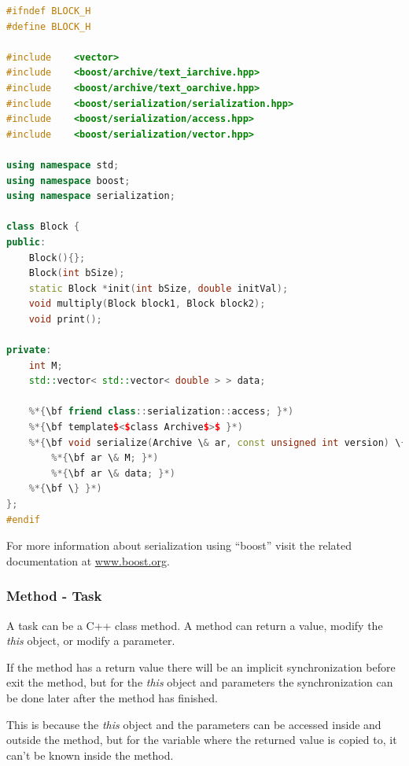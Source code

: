 \begin{lstlisting}[language=C++]
#ifndef BLOCK_H
#define BLOCK_H

#include    <vector>
#include    <boost/archive/text_iarchive.hpp>
#include    <boost/archive/text_oarchive.hpp>
#include    <boost/serialization/serialization.hpp>
#include    <boost/serialization/access.hpp>
#include    <boost/serialization/vector.hpp>

using namespace std;
using namespace boost;
using namespace serialization;

class Block {
public:
    Block(){};
    Block(int bSize);   
    static Block *init(int bSize, double initVal);
    void multiply(Block block1, Block block2);    
    void print();

private:
    int M;
    std::vector< std::vector< double > > data;
        
    %*{\bf friend class::serialization::access; }*)
    %*{\bf template$<$class Archive$>$ }*)
    %*{\bf void serialize(Archive \& ar, const unsigned int version) \{ }*)
        %*{\bf ar \& M; }*)
        %*{\bf ar \& data; }*)
    %*{\bf \} }*)
};
#endif
\end{lstlisting}

For more information about serialization using ``boost'' visit the related documentation at \url{www.boost.org}.


\subsubsection{Method - Task}

A task can be a C++ class method. A method can return a value, modify the \textit{this} object, or modify a parameter.

If the method has a return value there will be an implicit synchronization before exit the method, 
but for the \textit{this} object and parameters the synchronization can be done later after the method has finished.

This is because the \textit{this} object and the parameters can be accessed inside and outside the method, but for the 
variable where the returned value is copied to, it can’t be known inside the method.

